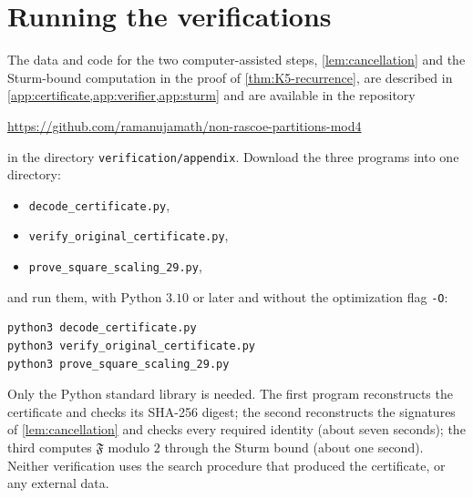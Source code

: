 \section{Running the verifications}\label{sec:verification}

The data and code for the two computer-assisted steps, \cref{lem:cancellation}
and the Sturm-bound computation in the proof of \cref{thm:K5-recurrence}, are
described in \cref{app:certificate,app:verifier,app:sturm} and are available in
the repository
\begin{center}
\url{https://github.com/ramanujamath/non-rascoe-partitions-mod4}
\end{center}
in the directory \texttt{verification/appendix}. Download the three programs into one directory:
\begin{itemize}
\item \texttt{decode\_certificate.py},
\item \texttt{verify\_original\_certificate.py},
\item \texttt{prove\_square\_scaling\_29.py},
\end{itemize}
and run them, with Python $3.10$ or later and without the optimization flag
\texttt{-O}:
\begin{verbatim}
python3 decode_certificate.py
python3 verify_original_certificate.py
python3 prove_square_scaling_29.py
\end{verbatim}
Only the Python standard library is needed. The first program reconstructs the
certificate and checks its SHA-256 digest; the second reconstructs the
signatures of \cref{lem:cancellation} and checks every required identity (about
seven seconds); the third computes $\mathfrak F$ modulo $2$ through the Sturm
bound (about one second). Neither verification uses the search procedure that
produced the certificate, or any external data.
